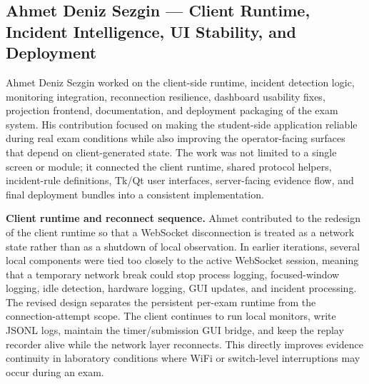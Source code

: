 %
%

\subsection{Ahmet Deniz Sezgin --- Client Runtime, Incident Intelligence, UI Stability, and Deployment}
Ahmet Deniz Sezgin worked on the client-side runtime, incident detection logic, monitoring integration, reconnection resilience, dashboard usability fixes, projection frontend, documentation, and deployment packaging of the exam system. His contribution focused on making the student-side application reliable during real exam conditions while also improving the operator-facing surfaces that depend on client-generated state. The work was not limited to a single screen or module; it connected the client runtime, shared protocol helpers, incident-rule definitions, Tk/Qt user interfaces, server-facing evidence flow, and final deployment bundles into a consistent implementation.

\textbf{Client runtime and reconnect sequence.} Ahmet contributed to the redesign of the client runtime so that a WebSocket disconnection is treated as a network state rather than as a shutdown of local observation. In earlier iterations, several local components were tied too closely to the active WebSocket session, meaning that a temporary network break could stop process logging, focused-window logging, idle detection, hardware logging, GUI updates, and incident processing. The revised design separates the persistent per-exam runtime from the connection-attempt scope. The client continues to run local monitors, write JSONL logs, maintain the timer/submission GUI bridge, and keep the replay recorder alive while the network layer reconnects. This directly improves evidence continuity in laboratory conditions where WiFi or switch-level interruptions may occur during an exam.

